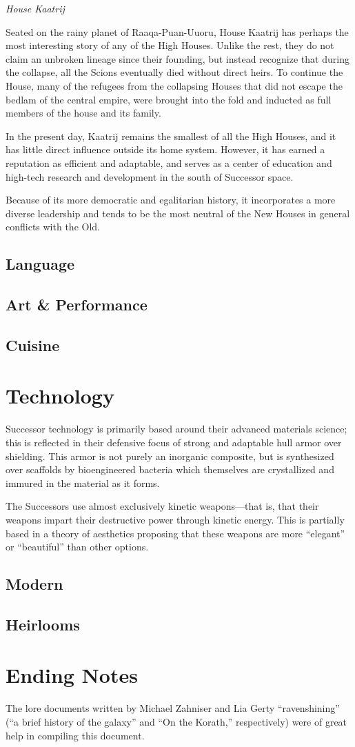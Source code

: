 \documentclass[11pt]{report}
\begin{document}
    \noindent
    \emph{House Kaatrij}

    Seated on the rainy planet of Raaqa-Puan-Uuoru, House Kaatrij has perhaps the most interesting story of any of the High Houses. Unlike the rest, they do not claim an unbroken lineage since their founding, but instead recognize that during the collapse, all the Scions eventually died without direct heirs. To continue the House, many of the refugees from the collapsing Houses that did not escape the bedlam of the central empire, were brought into the fold and inducted as full members of the house and its family.

    In the present day, Kaatrij remains the smallest of all the High Houses, and it has little direct influence outside its home system. However, it has earned a reputation as efficient and adaptable, and serves as a center of education and high-tech research and development in the south of Successor space.

    Because of its more democratic and egalitarian history, it incorporates a more diverse leadership and tends to be the most neutral of the New Houses in general conflicts with the Old.
    \bigskip

    \subsection{Language}
    \subsection{Art \& Performance}
    \subsection{Cuisine}
    \section{Technology}
    Successor technology is primarily based around their advanced materials science; this is reflected in their defensive focus of strong and adaptable hull armor over shielding. This armor is not purely an inorganic composite, but is synthesized over scaffolds by bioengineered bacteria which themselves are crystallized and immured in the material as it forms.

    The Successors use almost exclusively kinetic weapons---that is, that their weapons impart their destructive power through kinetic energy. This is partially based in a theory of aesthetics proposing that these weapons are more ``elegant'' or ``beautiful'' than other options.

    \subsection{Modern}
    \subsection{Heirlooms}
    \section{Ending Notes}
    The lore documents written by Michael Zahniser and Lia Gerty ``ravenshining'' (``a brief history of the galaxy'' and ``On the Korath,'' respectively) were of great help in compiling this document.
\end{document}
